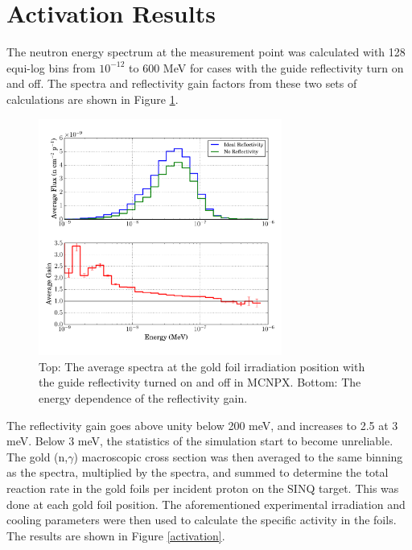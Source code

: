 \documentclass[a4paper,
              ]{jacow}
\begin{document}
\section{Activation Results}

The neutron energy spectrum at the measurement point was calculated with 128 equi-log bins from $10^{-12}$ to 600 MeV for cases with the guide reflectivity turn on and off.  The spectra and reflectivity gain factors from these two sets of calculations are shown in Figure \ref{gain}.  

\begin{figure}[!htb]
   \centering
   \includegraphics*[trim = 0mm 5mm 0mm 5mm, width=80mm]{graphics/gain.pdf}
   \caption{Top: The average spectra at the gold foil irradiation position with the guide reflectivity turned on and off in MCNPX.  Bottom: The energy dependence of the reflectivity gain.}
   \label{gain}
\end{figure}

The reflectivity gain goes above unity below 200 meV, and increases to 2.5 at 3 meV.  Below 3 meV, the statistics of the simulation start to become unreliable.  The gold (n,$\gamma$) macroscopic cross section was then averaged to the same binning as the spectra, multiplied by the spectra, and summed to determine the total reaction rate in the gold foils per incident proton on the SINQ target.  This was done at each gold foil position.  The aforementioned experimental irradiation and cooling parameters were then used to calculate the specific activity in the foils.  The results are shown in Figure \ref{activation}.
\end{document}
